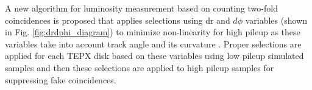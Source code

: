 A new algorithm for luminosity measurement based on counting two-fold coincidences is proposed that applies selections using dr and $d\phi$ variables (shown in Fig. \ref{fig:drdphi_diagram}) to minimize non-linearity for high pileup as these variables take into account track angle and its curvature \cite{sehrawat2020}.  Proper selections are applied for each TEPX disk based on these variables using low pileup simulated samples and then these selections are applied to high pileup samples for suppressing fake coincidences.


